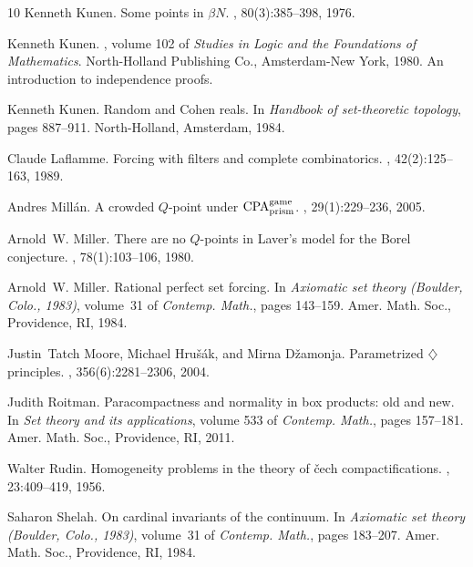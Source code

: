 \documentclass{article}%
\begin{document}
\begin{thebibliography}{10}
Kenneth Kunen.
\newblock Some points in {$\beta N$}.
, 80(3):385--398, 1976.

Kenneth Kunen.
, volume 102 of {\em Studies in Logic and the
  Foundations of Mathematics}.
\newblock North-Holland Publishing Co., Amsterdam-New York, 1980.
\newblock An introduction to independence proofs.

Kenneth Kunen.
\newblock Random and {C}ohen reals.
\newblock In {\em Handbook of set-theoretic topology}, pages 887--911.
  North-Holland, Amsterdam, 1984.

Claude Laflamme.
\newblock Forcing with filters and complete combinatorics.
, 42(2):125--163, 1989.

Andres Mill\'an.
\newblock A crowded {$Q$}-point under {${\rm CPA}^{\rm game}_{\rm prism}$}.
, 29(1):229--236, 2005.

Arnold~W. Miller.
\newblock There are no {$Q$}-points in {L}aver's model for the {B}orel
  conjecture.
, 78(1):103--106, 1980.

Arnold~W. Miller.
\newblock Rational perfect set forcing.
\newblock In {\em Axiomatic set theory ({B}oulder, {C}olo., 1983)}, volume~31
  of {\em Contemp. Math.}, pages 143--159. Amer. Math. Soc., Providence, RI,
  1984.

Justin~Tatch Moore, Michael Hru{\v{s}}{\'a}k, and Mirna D{\v{z}}amonja.
\newblock Parametrized {$\diamondsuit$} principles.
, 356(6):2281--2306, 2004.

Judith Roitman.
\newblock Paracompactness and normality in box products: old and new.
\newblock In {\em Set theory and its applications}, volume 533 of {\em Contemp.
  Math.}, pages 157--181. Amer. Math. Soc., Providence, RI, 2011.

Walter Rudin.
\newblock Homogeneity problems in the theory of \v cech compactifications.
, 23:409--419, 1956.

Saharon Shelah.
\newblock On cardinal invariants of the continuum.
\newblock In {\em Axiomatic set theory ({B}oulder, {C}olo., 1983)}, volume~31
  of {\em Contemp. Math.}, pages 183--207. Amer. Math. Soc., Providence, RI,
  1984.


\end{thebibliography}
\end{document}
